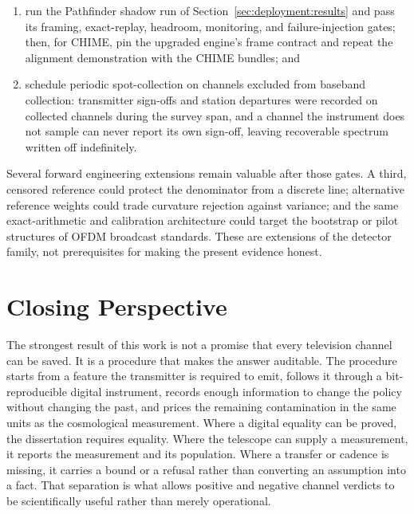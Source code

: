 \begin{enumerate}[leftmargin=2em]
  denominator;
  \item run the Pathfinder shadow run of Section~\ref{sec:deployment:results}
  and pass its framing, exact-replay, headroom, monitoring, and
  failure-injection gates; then, for CHIME, pin the upgraded engine's frame
  contract and repeat the alignment demonstration with the CHIME bundles; and
  \item schedule periodic spot-collection on channels excluded from baseband
  collection: transmitter sign-offs and station departures were recorded on
  collected channels during the survey span, and a channel the instrument does
  not sample can never report its own sign-off, leaving recoverable spectrum
  written off indefinitely.
\end{enumerate}

Several forward engineering extensions remain valuable after those gates.  A
third, censored reference could protect the denominator from a discrete line;
alternative reference weights could trade curvature rejection against variance;
and the same exact-arithmetic and calibration architecture could target the
bootstrap or pilot structures of OFDM broadcast standards.  These are extensions
of the detector family, not prerequisites for making the present evidence
honest.

\section{Closing Perspective}
\label{sec:conclusions:closing}

The strongest result of this work is not a promise that every television channel
can be saved.  It is a procedure that makes the answer auditable.  The procedure
starts from a feature the transmitter is required to emit, follows it through a
bit-reproducible digital instrument, records enough information to change the
policy without changing the past, and prices the remaining contamination in the
same units as the cosmological measurement.  Where a digital equality can be
proved, the dissertation requires equality.  Where the telescope can supply a
measurement, it reports the measurement and its population.  Where a transfer
or cadence is missing, it carries a bound or a refusal rather than converting an
assumption into a fact.  That separation is what allows positive and negative
channel verdicts to be scientifically useful rather than merely operational.

